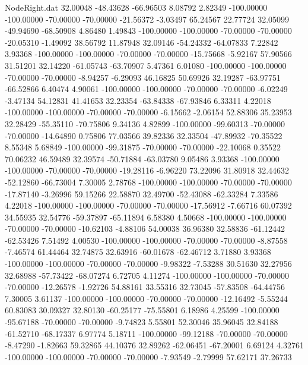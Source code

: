 \begin{filecontents}{NodeRight.dat}
  32.00048  -48.43628  -66.96503     8.08792    2.82349 -100.00000 -100.00000  -70.00000  -70.00000  -21.56372   -3.03497   65.24567   22.77724
  32.05099  -49.94690  -68.50908     4.86480    1.49843 -100.00000 -100.00000  -70.00000  -70.00000  -20.05310   -1.49092   38.56792   11.87948
  32.09146  -54.24332  -64.07833     7.22842    3.93368 -100.00000 -100.00000  -70.00000  -70.00000  -15.75668   -5.92167   57.90566   31.51201
  32.14220  -61.05743  -63.70907     5.47361    6.01080 -100.00000 -100.00000  -70.00000  -70.00000   -8.94257   -6.29093   46.16825   50.69926
  32.19287  -63.97751  -66.52866     6.40474    4.90061 -100.00000 -100.00000  -70.00000  -70.00000   -6.02249   -3.47134   54.12831   41.41653
  32.23354  -63.84338  -67.93846     6.33311    4.22018 -100.00000 -100.00000  -70.00000  -70.00000   -6.15662   -2.06154   52.88306   35.23953
  32.28429  -55.35110  -70.75806     9.34136    4.82899 -100.00000  -99.60313  -70.00000  -70.00000  -14.64890    0.75806   77.03566   39.82336
  32.33504  -47.89932  -70.35522     8.55348    5.68849 -100.00000  -99.31875  -70.00000  -70.00000  -22.10068    0.35522   70.06232   46.59489
  32.39574  -50.71884  -63.03780     9.05486    3.93368 -100.00000 -100.00000  -70.00000  -70.00000  -19.28116   -6.96220   73.22096   31.80918
  32.44632  -52.12860  -66.73004     7.30005    2.78768 -100.00000 -100.00000  -70.00000  -70.00000  -17.87140   -3.26996   59.15266   22.58870
  32.49700  -52.43088  -62.33284     7.33586    4.22018 -100.00000 -100.00000  -70.00000  -70.00000  -17.56912   -7.66716   60.07392   34.55935
  32.54776  -59.37897  -65.11894     6.58380    4.50668 -100.00000 -100.00000  -70.00000  -70.00000  -10.62103   -4.88106   54.00038   36.96380
  32.58836  -61.12442  -62.53426     7.51492    4.00530 -100.00000 -100.00000  -70.00000  -70.00000   -8.87558   -7.46574   61.44464   32.74875
  32.63916  -60.01678  -62.46712     3.71880    3.93368 -100.00000 -100.00000  -70.00000  -70.00000   -9.98322   -7.53288   30.51630   32.27956
  32.68988  -57.73422  -68.07274     6.72705    4.11274 -100.00000 -100.00000  -70.00000  -70.00000  -12.26578   -1.92726   54.88161   33.55316
  32.73045  -57.83508  -64.44756     7.30005    3.61137 -100.00000 -100.00000  -70.00000  -70.00000  -12.16492   -5.55244   60.83083   30.09327
  32.80130  -60.25177  -75.55801     6.18986    4.25599 -100.00000  -95.67188  -70.00000  -70.00000   -9.74823    5.55801   52.30046   35.96045
  32.84188  -61.52710  -68.17337     6.97774    5.18711 -100.00000  -99.12188  -70.00000  -70.00000   -8.47290   -1.82663   59.32865   44.10376
  32.89262  -62.06451  -67.20001     6.69124    4.32761 -100.00000 -100.00000  -70.00000  -70.00000   -7.93549   -2.79999   57.62171   37.26733

\end{filecontents}
